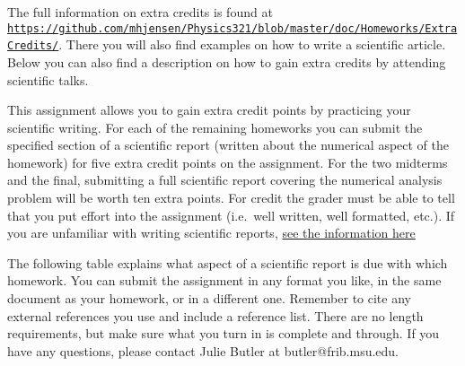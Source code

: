 \documentclass[%
oneside,                 %
final,                   %
10pt]{article}
\begin{document}
The full information on extra credits is found at \href{{https://github.com/mhjensen/Physics321/blob/master/doc/Homeworks/ExtraCredits/}}{\nolinkurl{https://github.com/mhjensen/Physics321/blob/master/doc/Homeworks/ExtraCredits/}}. There you will also find examples on how to write a scientific article. 
Below you can also find a description on how to gain extra credits by attending scientific talks.

This assignment allows you to gain extra credit points by practicing
your scientific writing.  For each of the remaining homeworks you can
submit the specified section of a scientific report (written about the
numerical aspect of the homework) for five extra credit points on the
assignment.  For the two midterms and the final, submitting a full
scientific report covering the numerical analysis problem will be
worth ten extra points.  For credit the grader must be able to tell
that you put effort into the assignment (i.e.~well written, well
formatted, etc.).  If you are unfamiliar with writing scientific
reports, \href{{https://github.com/mhjensen/Physics321/blob/master/doc/Homeworks/ExtraCredits/IntroductionScientificWriting.md}}{see the information here}

The following table explains what aspect of a scientific report is due
with which homework.  You can submit the assignment in any format you
like, in the same document as your homework, or in a different one.
Remember to cite any external references you use and include a
reference list.  There are no length requirements, but make sure what
you turn in is complete and through.  If you have any questions,
please contact Julie Butler at butler@frib.msu.edu.
\end{document}

